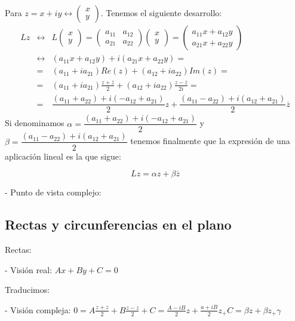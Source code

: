 Para \(z = x+iy \leftrightarrow \begin{pmatrix}
 x \\
 y
\end{pmatrix} \). Tenemos el siguiente desarrollo:
\begin{eqnarray*}
  Lz & \leftrightarrow & L\begin{pmatrix}
    x \\
    y
  \end{pmatrix} = \begin{pmatrix}
  a_{11} & a_{12} \\
  a_{21} & a_{22}
  \end{pmatrix}\begin{pmatrix}
    x \\
    y
  \end{pmatrix} = \begin{pmatrix}
  a_{11}x + a_{12}y \\
  a_{21}x + a_{22}y
  \end{pmatrix} \\
   & \leftrightarrow & (a_{11}x + a_{12}y)+i(a_{21}x + a_{22}y) = \\
   & = & (a_{11}+ia_{21})Re(z) + (a_{12}+ia_{22})Im(z) = \\
   & = & (a_{11}+ia_{21})\frac{z+\overline{z}}{2} + (a_{12}+ia_{22})\frac{z-\overline{z}}{2i} = \\
   & = & \dfrac{(a_{11}+a_{22})+i(-a_{12}+a_{21})}{2}z+\dfrac{(a_{11}-a_{22})+i(a_{12}+a_{21})}{2}\overline{z}
\end{eqnarray*}
Si denominamos \( \alpha = \dfrac{(a_{11}+a_{22})+i(-a_{12}+a_{21})}{2} \) y \( \beta = \dfrac{(a_{11}-a_{22})+i(a_{12}+a_{21})}{2} \) tenemos finalmente que la expresión de una aplicación lineal es la que sigue:

\[Lz = \alpha z + \beta \overline{z}\]

- Punto de vista complejo:


\subsection{Rectas y circunferencias en el plano}

Rectas:

- Visión real: \(Ax + By + C = 0\)

Traducimos:

- Visión compleja: \(0 = A \frac{z+z}{2}+B \frac{z-z}{2} + C = \frac{A-iB}{2}z+\frac{a+iB}{2}z_ + C = \beta z + \beta z_ + \gamma \) 

